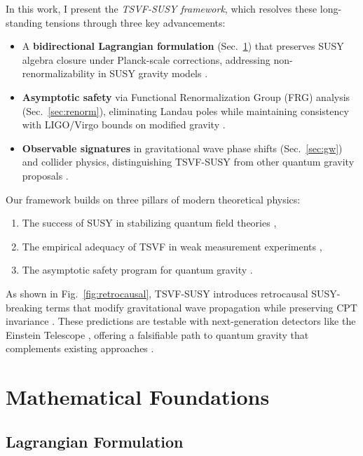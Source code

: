 \documentclass[twocolumn,superscriptaddress,floatfix]{revtex4-2}
\begin{document}
In this work, I present the \emph{TSVF-SUSY framework}, which resolves these long-standing tensions through three key advancements:
\begin{itemize}
\item A \textbf{bidirectional Lagrangian formulation} (Sec.~\ref{sec:math}) that preserves SUSY algebra closure under Planck-scale corrections, addressing non-renormalizability in SUSY gravity models \cite{Ferrara1974}. 
\item \textbf{Asymptotic safety} via Functional Renormalization Group (FRG) analysis (Sec.~\ref{sec:renorm}), eliminating Landau poles while maintaining consistency with LIGO/Virgo bounds on modified gravity \cite{LIGO2021}.
\item \textbf{Observable signatures} in gravitational wave phase shifts (Sec.~\ref{sec:gw}) and collider physics, distinguishing TSVF-SUSY from other quantum gravity proposals \cite{Rovelli2004,Ashtekar2006}.
\end{itemize}

Our framework builds on three pillars of modern theoretical physics: 
\begin{enumerate}
\item The success of SUSY in stabilizing quantum field theories \cite{Martin1997},
\item The empirical adequacy of TSVF in weak measurement experiments \cite{Kocsis2011},
\item The asymptotic safety program for quantum gravity \cite{Reuter1998}.
\end{enumerate}

As shown in Fig.~\ref{fig:retrocausal}, TSVF-SUSY introduces retrocausal SUSY-breaking terms that modify gravitational wave propagation while preserving CPT invariance \cite{Greenberg2002}. These predictions are testable with next-generation detectors like the Einstein Telescope \cite{Punturo2010}, offering a falsifiable path to quantum gravity that complements existing approaches \cite{Rovelli2004,Ashtekar2006}.


\section{Mathematical Foundations}  
\label{sec:math}   

\subsection{Lagrangian Formulation}  
\label{subsec:lagrangian}    
\end{document}
